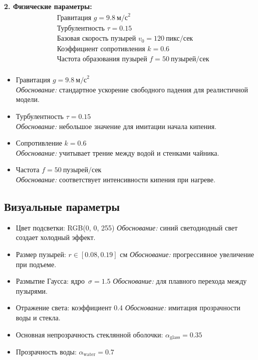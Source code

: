 \documentclass[areasetadvanced]{scrartcl}
\begin{document}
\textbf{2. Физические параметры:}
\begin{align*}
    &\text{Гравитация } g = 9.8~\text{м/с}^2 \\
    &\text{Турбулентность } \tau = 0.15 \\
    &\text{Базовая скорость пузырей } v_0 = 120~\text{пикс/сек} \\
    &\text{Коэффициент сопротивления } k = 0.6 \\
    &\text{Частота образования пузырей } f = 50~\text{пузырей/сек} \\
\end{align*}

\begin{itemize}
    \item Гравитация $g = 9.8~\text{м/с}^2$\\
    \textit{Обоснование:} стандартное ускорение свободного падения для реалистичной модели.
    \item Турбулентность $\tau = 0.15$\\
    \textit{Обоснование:} небольшое значение для имитации начала кипения.
    \item Сопротивление $k = 0.6$\\
    \textit{Обоснование:} учитывает трение между водой и стенками чайника.
    \item Частота $f = 50~\text{пузырей/сек}$\\
    \textit{Обоснование:} соответствует интенсивности кипения при нагреве.
\end{itemize}

\newpage
\subsection{Визуальные параметры}
\begin{itemize}
    \item Цвет подсветки: RGB(0, 0, 255)
    \textit{Обоснование:} синий светодиодный свет создает холодный эффект.
    \item Размер пузырей: $r \in [0.08, 0.19]$ см
    \textit{Обоснование:} прогрессивное увеличение при подъеме.
    \item Размытие Гаусса: ядро $\,\sigma\!=\!1.5$
    \textit{Обоснование:} для плавного перехода между пузырями.
    \item Отражение света: коэффициент 0.4
    \textit{Обоснование:} имитация прозрачности воды и стекла.
    \item Основная непрозрачность стеклянной оболочки: $\alpha_{\text{glass}} = 0.35$
    \item Прозрачность воды: $\alpha_{\text{water}} = 0.7$
\end{itemize}
\end{document}
